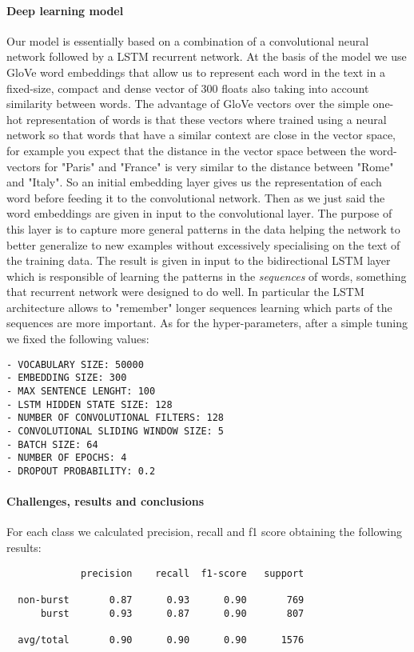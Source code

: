 \documentclass[a4paper, 9pt]{article}
\begin{document}
\paragraph*{Deep learning model}
Our model is essentially based on a combination of a convolutional neural network followed by a LSTM 
recurrent network. At the basis of the model we use GloVe word embeddings that allow us to represent each
word in the text in a fixed-size, compact and dense vector of 300 floats also taking into account similarity
between words. The advantage of GloVe vectors over the simple one-hot representation of words is that these
vectors where trained using a neural network so that words that have a similar context are close in the
vector space, for example you expect that the distance in the vector space between the word-vectors for
"Paris" and "France" is very similar to the distance between "Rome" and "Italy". So an initial embedding
layer gives us the representation of each word before feeding it to the convolutional network.
Then as we just said the word embeddings are given in input to the convolutional layer. The purpose of this
layer is to capture more general patterns in the data helping the network to better generalize to new
examples without excessively specialising on the text of the training data. The result is given in input to
the bidirectional LSTM layer which is responsible of learning the patterns in the \emph{sequences} of words,
something that recurrent network were designed to do well. In particular the LSTM architecture allows to
"remember" longer sequences learning which parts of the sequences are more important. As for the
hyper-parameters, after a simple tuning we fixed the following values:
\begin{verbatim}
- VOCABULARY SIZE: 50000
- EMBEDDING SIZE: 300
- MAX SENTENCE LENGHT: 100
- LSTM HIDDEN STATE SIZE: 128
- NUMBER OF CONVOLUTIONAL FILTERS: 128
- CONVOLUTIONAL SLIDING WINDOW SIZE: 5
- BATCH SIZE: 64
- NUMBER OF EPOCHS: 4
- DROPOUT PROBABILITY: 0.2
\end{verbatim}

\paragraph*{Challenges, results and conclusions}
For each class we calculated precision, recall and f1 score obtaining the following results:
\begin{verbatim}
             precision    recall  f1-score   support

  non-burst       0.87      0.93      0.90       769
      burst       0.93      0.87      0.90       807

  avg/total       0.90      0.90      0.90      1576
\end{verbatim}
\end{document}
